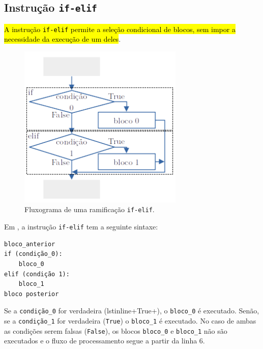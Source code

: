 \subsection{Instrução \lstinline+if-elif+}

\hl{A instrução {\lstinline+if-elif+} permite a seleção condicional de blocos, sem impor a necessidade da execução de um deles}.

\begin{figure}[H]
  \centering
  \includegraphics[width=0.7\textwidth]{./cap_progest/dados/fig_fg_elif/fig}
  \caption{Fluxograma de uma ramificação \lstinline+if-elif+.}
  \label{cap_progest_sec_ramifica:fig:fg_elif}
\end{figure}

Em {\python}, a instrução \lstinline+if-elif+ tem a seguinte sintaxe:
\begin{lstlisting}
bloco_anterior
if (condição_0):
    bloco_0
elif (condição 1):
    bloco_1
bloco posterior
\end{lstlisting}
Se a \lstinline+condição_0+ for verdadeira (lstinline+True+), o \lstinline+bloco_0+ é executado. Senão, se a \lstinline+condição_1+ for verdadeira (\lstinline+True+) o \lstinline+bloco_1+ é executado. No caso de ambas as condições serem falsas (\lstinline+False+), os blocos \lstinline+bloco_0+ e \lstinline+bloco_1+ não são executados e o fluxo de processamento segue a partir da linha 6.

